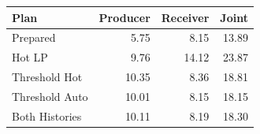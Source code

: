\begingroup\fontsize{8}{9.5}\selectfont\setlength{\tabcolsep}{3.2pt}
\begin{tabular*}{\columnwidth}{@{\extracolsep{\fill}}lrrr@{}}
\toprule
Plan & Producer & Receiver & Joint\\
\midrule
Prepared & 5.75 & 8.15 & 13.89\\
Hot LP & 9.76 & 14.12 & 23.87\\
Threshold Hot & 10.35 & 8.36 & 18.81\\
Threshold Auto & 10.01 & 8.15 & 18.15\\
Both Histories & 10.11 & 8.19 & 18.30\\
\bottomrule
\end{tabular*}
\endgroup
